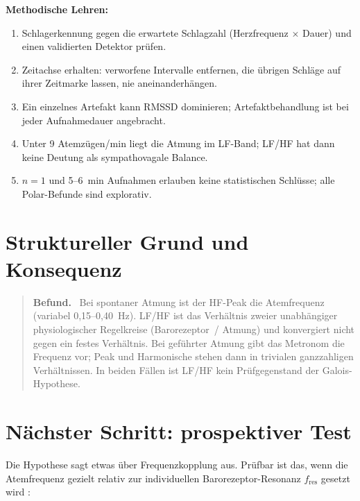 \textbf{Methodische Lehren:}
\begin{enumerate}
\item Schlagerkennung gegen die erwartete Schlagzahl
  (Herzfrequenz $\times$ Dauer) und einen validierten Detektor prüfen.
\item Zeitachse erhalten: verworfene Intervalle entfernen, die übrigen
  Schläge auf ihrer Zeitmarke lassen, nie aneinanderhängen.
\item Ein einzelnes Artefakt kann RMSSD dominieren; Artefaktbehandlung ist
  bei jeder Aufnahmedauer angebracht.
\item Unter 9 Atemzügen/min liegt die Atmung im LF-Band; LF/HF hat dann
  keine Deutung als sympathovagale Balance.
\item $n=1$ und 5--6~min Aufnahmen erlauben keine statistischen Schlüsse;
  alle Polar-Befunde sind explorativ.
\end{enumerate}

\section{Struktureller Grund und Konsequenz}

\begin{quote}
\textbf{Befund.} \BM\ Bei spontaner Atmung ist der HF-Peak die
Atemfrequenz (variabel 0{,}15--0{,}40~Hz). LF/HF ist das Verhältnis
zweier unabhängiger physiologischer Regelkreise (Barorezeptor~/ Atmung)
und konvergiert nicht gegen ein festes Verhältnis. Bei geführter Atmung
gibt das Metronom die Frequenz vor; Peak und Harmonische stehen dann in
trivialen ganzzahligen Verhältnissen. In beiden Fällen ist LF/HF kein
Prüfgegenstand der Galois-Hypothese.
\end{quote}

\section{Nächster Schritt: prospektiver Test}\label{sec:360next}

Die Hypothese sagt etwas über Frequenzkopplung aus. Prüfbar ist das,
wenn die Atemfrequenz gezielt relativ zur individuellen
Barorezeptor-Resonanz $f_\text{res}$ gesetzt wird \SM:

